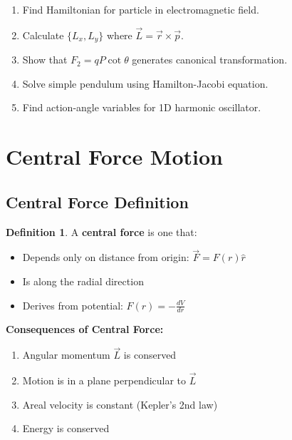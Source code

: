 \documentclass[12pt,a4paper]{article}
\theoremstyle{definition}
\newtheorem{definition}[theorem]{Definition}
\begin{document}
\begin{enumerate}
    \item Find Hamiltonian for particle in electromagnetic field.
    
    \item Calculate $\{L_x, L_y\}$ where $\vec{L} = \vec{r} \times \vec{p}$.
    
    \item Show that $F_2 = qP\cot\theta$ generates canonical transformation.
    
    \item Solve simple pendulum using Hamilton-Jacobi equation.
    
    \item Find action-angle variables for 1D harmonic oscillator.
\end{enumerate}

\newpage
\section{Central Force Motion}

\subsection{Central Force Definition}

\begin{definition}
A \textbf{central force} is one that:
\begin{itemize}
    \item Depends only on distance from origin: $\vec{F} = F(r)\hat{r}$
    \item Is along the radial direction
    \item Derives from potential: $F(r) = -\frac{dV}{dr}$
\end{itemize}
\end{definition}

\begin{importantbox}
\textbf{Consequences of Central Force:}
\begin{enumerate}
    \item Angular momentum $\vec{L}$ is conserved
    \item Motion is in a plane perpendicular to $\vec{L}$
    \item Areal velocity is constant (Kepler's 2nd law)
    \item Energy is conserved
\end{enumerate}
\end{importantbox}
\end{document}
